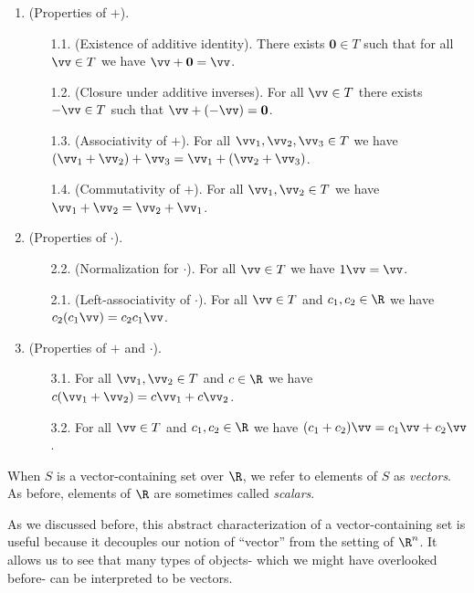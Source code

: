 \begin{defn}
    \begin{enumerate}
        \item (Properties of $+$).
        \begin{enumerate}
                \item[1.1.] (Existence of additive identity). There exists $\mathbf{0} \in T$ such that for all $\vv \in T$ we have $\vv + \mathbf{0} = \vv$.
                \item[1.2.] (Closure under additive inverses). For all $\vv \in T$ there exists $-\vv \in T$ such that $\vv + (-\vv) = \mathbf{0}$.
                \item[1.3.] (Associativity of $+$). For all $\vv_1, \vv_2, \vv_3 \in T$ we have $(\vv_1 + \vv_2) + \vv_3 = \vv_1 + (\vv_2 + \vv_3)$.
                \item[1.4.] (Commutativity of $+$). For all $\vv_1, \vv_2 \in T$ we have $\vv_1 + \vv_2 = \vv_2 + \vv_1$.
            \end{enumerate}
        \item (Properties of $\cdot$).
        \begin{enumerate}
            \item[2.2.] (Normalization for $\cdot$). For all $\vv \in T$ we have $1 \vv = \vv$.
            \item[2.1.] (Left-associativity of $\cdot$). For all $\vv \in T$ and $c_1, c_2 \in \R$ we have $c_2 (c_1 \vv) = c_2 c_1 \vv$.
        \end{enumerate}
        \item (Properties of $+$ and $\cdot$).
        \begin{enumerate}
            \item[3.1.] For all $\vv_1, \vv_2 \in T$ and $c \in \R$ we have $c(\vv_1 + \vv_2) = c \vv_1 + c \vv_2$.
            \item[3.2.] For all $\vv \in T$ and $c_1, c_2 \in \R$ we have $(c_1 + c_2)\vv = c_1 \vv + c_2 \vv$.
        \end{enumerate}
    \end{enumerate} 
    
    When $S$ is a vector-containing set over $\R$, we refer to elements of $S$ as \textit{vectors}. As before, elements of $\R$ are sometimes called \textit{scalars}.
\end{defn}

As we discussed before, this abstract characterization of a vector-containing set is useful because it decouples our notion of ``vector'' from the setting of $\R^n$. It allows us to see that many types of objects- which we might have overlooked before- can be interpreted to be vectors.

